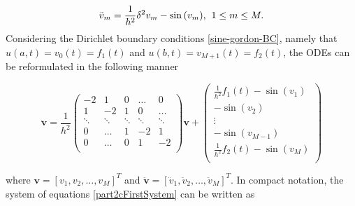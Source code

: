 \begin{equation*}
    \ddot{v}_m = \frac{1}{h^2}\delta^2 v_m - \sin{(v_m)} \text{,} \hspace{2mm} 1 \le m \le M.
\end{equation*} 
Considering the Dirichlet boundary conditions \eqref{sine-gordon-BC}, namely that $u(a,t) = v_0(t) = f_1(t)$ and $u(b,t)=v_{M+1}(t)= f_2(t)$, the ODEs can be reformulated in the following manner

\begin{equation}
    \boldsymbol{\ddot{v}} = \frac{1}{h^2} 
    \begin{pmatrix}
    -2 & 1 & 0 & \dots & 0\\
    1 & -2 & 1 & 0 & \dots \\
    \ddots & \ddots & \ddots & \ddots &\ddots \\
    0 & \dots & 1 & -2 & 1 \\
    0 & \dots & 0 & 1 & -2 \\
    \end{pmatrix}
    \boldsymbol{v} + 
    \begin{pmatrix}
    \frac{1}{h^2} f_1(t) - \sin{(v_1)} \\
    -\sin{(v_2)} \\
    \vdots \\
    -\sin{(v_{M-1})} \\
    \frac{1}{h^2} f_2(t) - \sin{(v_M)}\\
    \end{pmatrix} %
    \label{part2cFirstSystem}
\end{equation}

\noindent where $\boldsymbol{v} = [v_1,v_2,\dots,v_M]^T$ and $\boldsymbol{\ddot{v}} = [\ddot{v}_1,\ddot{v}_2,\dots,\ddot{v}_M]^T$. In compact notation, the system of equations \eqref{part2cFirstSystem} can be written as


